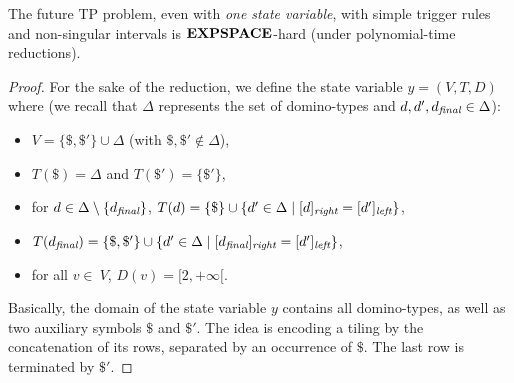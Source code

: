 \begin{theorem*}[\ref{theorem:EXPSPlowerBound}]
The future TP problem, even with \emph{one state variable}, with simple trigger rules and non-singular intervals is $\textbf{EXPSPACE}$-hard (under polynomial-time reductions).
\end{theorem*}
\begin{proof}
For the sake of the reduction, 
we define the state variable $y=(V,T,D)$ where (we recall that $\Delta$ represents the set of domino-types and $d,d',d_{\textit{final}}\in\Delta$): 
\begin{itemize}
    \item $V=\{\$,\$'\}\cup\Delta$ (with $\$,\$'\notin\Delta$),
    \item $T(\$)=\Delta$ and $T(\$')=\{\$'\}$,
    \item for $d\in \Delta\setminus\{d_{\textit{final}}\}$, $T(d)=\{\$\}\cup\{d'\in\Delta\mid [d]_{\textit{right}}=[d']_{\textit{left}} \}$,
    \item $T(d_{\textit{final}})=\{\$,\$'\}\cup\{d'\in\Delta\mid [d_{\textit{final}}]_{\textit{right}}=[d']_{\textit{left}} \}$,
    \item for all $v\in\ V$, $D(v)=[2,+\infty[$.
\end{itemize}
Basically, the domain of the state variable $y$ contains all domino-types, as well as two auxiliary symbols $\$$ and $\$'$. 
The idea is encoding a tiling by the concatenation of its rows, separated by an occurrence of $\$$. The last row is terminated by $\$'$.


\end{proof}
